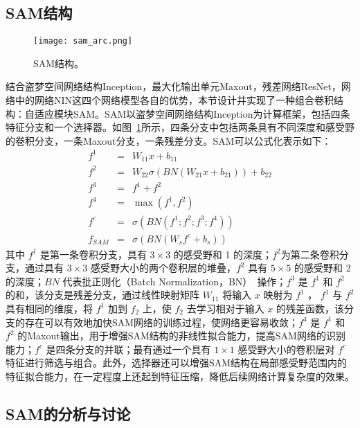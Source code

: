 \subsection{SAM结构}
\label{sec:sap:model:arc}

\begin{figure}[h]
\centering
\texttt{[image: sam\_arc.png]}
\caption{SAM结构。}
\label{fig:sam}
\end{figure}

结合盗梦空间网络结构Inception，最大化输出单元Maxout，残差网络ResNet，网络中的网络NIN这四个网络模型各自的优势，本节设计并实现了一种组合卷积结构：自适应模块SAM。SAM以盗梦空间网络结构Inception为计算框架，包括四条特征分支和一个选择器。如图~\ref{fig:sam}所示，四条分支中包括两条具有不同深度和感受野的卷积分支，一条Maxout分支，一条残差分支。SAM可以公式化表示如下：
\begin{eqnarray} \label{equ:sam}
f^{1} &=& W_{11}x+b_{11} \nonumber\\
f^{2} &=& W_{22}\sigma(BN(W_{21}x+b_{21}))+b_{22} \nonumber\\
f^{3} &=& f^{1}+f^{2} \nonumber\\
f^{4} &=& \max(f^1, f^2) \nonumber\\
f^{c} &=& {\sigma}(BN(f^1; f^2; f^3; f^4)) \nonumber\\
f_{SAM} &=& {\sigma}(BN(W_{s}f^{c}+b_{s}))
\end{eqnarray}
其中 $f^{1}$ 是第一条卷积分支，具有 $3\times3$ 的感受野和 1 的深度；$f^{2}$为第二条卷积分支，通过具有 $3\times3$ 感受野大小的两个卷积层的堆叠，$f^{2}$ 具有 $5\times5$ 的感受野和 2 的深度；$BN$ 代表批正则化（Batch Normalization，BN）~\cite{ioffe2015batch}操作；$f^{3}$ 是 $f^{1}$ 和 $f^{2}$ 的和，该分支是残差分支，通过线性映射矩阵 $W_{11}$ 将输入 $x$ 映射为 $f^{1}$ ， $f^{1}$ 与 $f^{2}$ 具有相同的维度，将 $f^{1}$ 加到 $f_{2}$ 上，使 $f_{2}$ 去学习相对于输入 $x$ 的残差函数，该分支的存在可以有效地加快SAM网络的训练过程，使网络更容易收敛；$f^{4}$ 是 $f^{1}$ 和 $f^{2}$ 的Maxout输出，用于增强SAM结构的非线性拟合能力，提高SAM网络的识别能力；$f^{c}$ 是四条分支的并联；最有通过一个具有 $1\times1$ 感受野大小的卷积层对 $f^{c}$ 特征进行筛选与组合。此外，选择器还可以增强SAM结构在局部感受野范围内的特征拟合能力，在一定程度上还起到特征压缩，降低后续网络计算复杂度的效果。

\subsection{SAM的分析与讨论}
\label{sec:sap:model:discuss}

